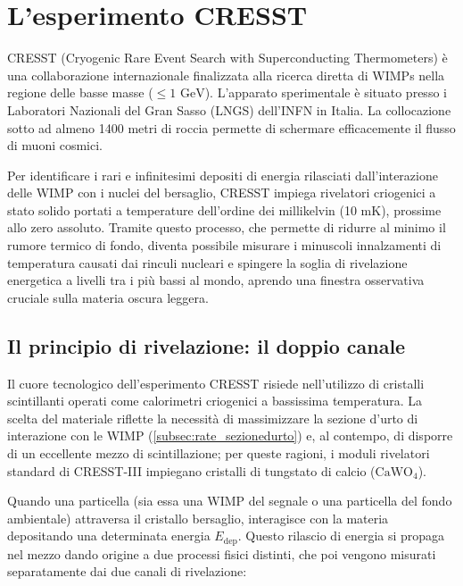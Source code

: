 \chapter{L'esperimento CRESST}
\label{ch:CRESST}

CRESST (Cryogenic Rare Event Search with Superconducting Thermometers) è una collaborazione internazionale finalizzata alla ricerca diretta di WIMPs nella regione delle basse masse ($ \leq 1 \text{ GeV}$). L'apparato sperimentale è situato presso i Laboratori Nazionali del Gran Sasso (LNGS) dell'INFN in Italia.
La collocazione sotto ad almeno 1400 metri di roccia permette di schermare efficacemente il flusso di muoni cosmici.

Per identificare i rari e infinitesimi depositi di energia rilasciati dall'interazione delle WIMP con i nuclei del bersaglio, CRESST impiega rivelatori criogenici a stato solido portati a temperature dell'ordine dei millikelvin (10 mK), prossime allo zero assoluto. Tramite questo processo, che permette di ridurre al minimo il rumore termico di fondo, diventa possibile misurare i minuscoli innalzamenti di temperatura causati dai rinculi nucleari e spingere la soglia di rivelazione energetica a livelli tra i più bassi al mondo, aprendo una finestra osservativa cruciale sulla materia oscura leggera.

\section{Il principio di rivelazione: il doppio canale}
\label{sec:doppio_canale}

Il cuore tecnologico dell'esperimento CRESST risiede nell'utilizzo di cristalli scintillanti operati come calorimetri criogenici a bassissima temperatura. La scelta del materiale riflette la necessità di massimizzare la sezione d'urto di interazione con le WIMP (\ref{subsec:rate_sezionedurto}) e, al contempo, di disporre di un eccellente mezzo di scintillazione; per queste ragioni, i moduli rivelatori standard di CRESST-III impiegano cristalli di tungstato di calcio ($\text{CaWO}_4$). 

Quando una particella (sia essa una WIMP del segnale o una particella del fondo ambientale) attraversa il cristallo bersaglio, interagisce con la materia depositando una determinata energia $E_{\text{dep}}$. Questo rilascio di energia si propaga nel mezzo dando origine a due processi fisici distinti, che poi vengono misurati separatamente dai due canali di rivelazione:

